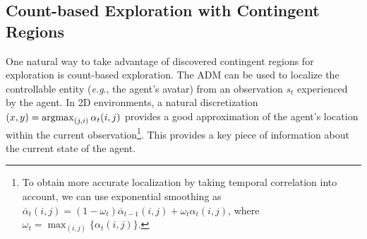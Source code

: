 \documentclass{article} \usepackage{iclr,times}
\makeatletter
\newcommand{\argmax}{\operatornamewithlimits{argmax}}
\DeclareRobustCommand\onedot{\futurelet\@let@token\@onedot}
\def\onedot{.}
\def\eg{\emph{e.g}\onedot} \def\Eg{\emph{E.g}\onedot}
\makeatother
\begin{document}
\vspace*{-4pt}
\subsection{Count-based Exploration with Contingent Regions}
\vspace*{-5pt}


One natural way to take advantage of discovered contingent regions for exploration
is count-based exploration.
The ADM can be used to localize the controllable entity (\eg, the agent's avatar) from an observation $s_t$ experienced by the agent.
In 2D environments,
a natural discretization $
(x, y) = \textstyle\argmax_{(j, i)}  \alpha_t (i, j)
$
provides a good approximation of the agent's location within the current observation\footnote{To obtain more accurate localization by taking temporal correlation into account,
we can use exponential smoothing as
$\overline{\alpha}_t(i, j) = (1 - \omega_t) \overline{\alpha}_{t-1}(i, j) + \omega_t \alpha_t(i, j)$,
where ${\omega_t} = \max_{(i,j)}\{\alpha_t (i,j)\}$. }.
This provides a key piece of information about the current state of the agent.









\label{sec:overview}
\end{document}
